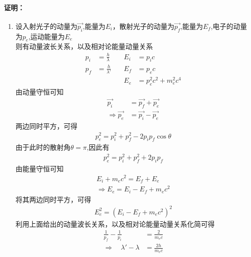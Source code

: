 \documentclass{article}
\begin{document}
\paragraph{证明：}
\begin{enumerate}
    \item 设入射光子的动量为$\vec{p_i}$,能量为$E_i$，散射光子的动量为$\vec{p_f}$,能量为$E_f$,电子的动量为$p_e$,运动能量为$E_e$\\
          则有动量波长关系，以及相对论能量动量关系
          \begin{align*}
              p_i & = \frac{h}{\lambda}  & \quad E_i & = p_ic               \\
              p_f & = \frac{h}{\lambda'} & \quad E_f & = p_ec               \\
              ~   & ~                    & \quad E_e & = p_e^2c^2 +m_e^2c^4
          \end{align*}
          由动量守恒可知
          \begin{align*}
              \vec{p_i}             & = \vec{p_f}+\vec{p_e} \\
              \Rightarrow \vec{p_e} & = \vec{p_i}-\vec{p_e}
          \end{align*}
          两边同时平方，可得
          \begin{eqnarray*}
              p_e^2 = p_i^2+p_f^2-2p_ip_f\cos\theta
          \end{eqnarray*}
          由于此时的散射角$\theta = \pi$,因此有
          \begin{eqnarray*}
              p_e^2 = p_i^2+p_f^2+2p_ip_f
          \end{eqnarray*}
          由能量守恒可知
          \begin{eqnarray*}
              E_i+m_ec^2 = E_f +E_e\\
              \Rightarrow E_e = E_i-E_f+m_ec^2
          \end{eqnarray*}
          将其两边同时平方，可得
          \begin{eqnarray*}
              E_e^2 = (E_i-E_f+m_ec^2)^2
          \end{eqnarray*}
          利用上面给出的动量波长关系，以及相对论能量动量关系化简可得
          \begin{align*}
              \frac{1}{p_f}-\frac{1}{p_i}&=\displaystyle\frac{2}{m_ec}\\
              \Rightarrow \quad\lambda'-\lambda&=\displaystyle\frac{2h}{m_ec}
          \end{align*}





\end{enumerate}
\end{document}
